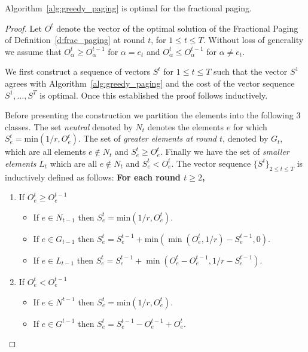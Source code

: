 \begin{lemma}
Algorithm~\ref{alg:greedy_paging} is optimal for the fractional paging.
\end{lemma}
\begin{proof}
Let $O^t$ denote the vector of the optimal solution of the Fractional Paging of Definition~\ref{d:frac_paging}
at round $t$, for $1 \leq t \leq T$. Without loss of generality we assume that $O_\alpha^t \geq O_\alpha^{t-1}$ for $\alpha = e_t$ and $O_\alpha^t \leq O_\alpha^{t-1}$ for $\alpha \neq e_t$.

We first construct a sequence of vectors $S^t$ for $1\leq t \leq T$ such that the vector $S^1$ agrees with Algorithm~\ref{alg:greedy_paging} and the cost of the vector sequence $S^1,\ldots,S^T$ is optimal. Once this established the proof follows inductively.

Before presenting the construction we partition the elements into the following $3$ classes. 
The set \textit{neutral} denoted by $N_t$ denotes the elements $e$ for which $S_e^t = \text{min}(1/r , O_e^t)$. The set of \textit{greater elements at round $t$}, denoted by $G_t$, which are all elements $e \notin N_t$ and $S_e^t \geq O_e^t$. Finally we have the set of \textit{smaller elements} $L_t$ which are all $e \notin N_t$ and $S_e^t < O_e^t$. The vector sequence $\{S^t \}_{2\leq t \leq T}$ is inductively defined as follows: \textbf{For each round $t \geq 2$,}

\begin{enumerate}
    \item If $O_e^t \geq O_e^{t-1}$
    \begin{itemize}
        \item If $e \in N_{t-1}$ then $S_e^t = \text{min}( 1/r , O_e^t)$.
        
        \item If $e \in G_{t-1}$ then $S_e^t =S_e^{t-1} + \text{min}\left(\min(O_e^t,1/r) - S_e^{t-1},0\right)$.
                
        \item If $e \in L_{t-1}$ then $S_e^t = S_e^{t-1} + \min(O_e^t - O_e^{t-1},1/r - S_e^{t-1})$.
    \end{itemize}
    
    \item If $O_e^t < O_e^{t-1}$
    \begin{itemize}
        \item If $e \in N^{t-1}$ then $S_e^t = \text{min}( 1/r , O_e^t)$.
        
        \item If $e \in G^{t-1}$ then $S_e^t = S_e^{t-1} - O_e^{t-1} +  O_e^t$.
                

\end{itemize}
\end{enumerate}
\end{proof}
